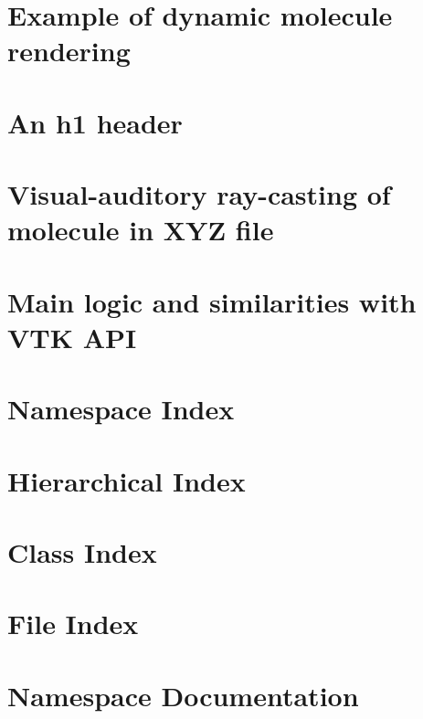 \let\mypdfximage\pdfximage\def\pdfximage{\immediate\mypdfximage}\documentclass[twoside]{book}
\newcommand{\+}{\discretionary{\mbox{\scriptsize$\hookleftarrow$}}{}{}}
\begin{document}
\chapter{Example of dynamic molecule rendering}
\label{md_core_src_doc_molecule_pipeline}

\chapter{An h1 header}
\label{md_core_src_doc_tutorial_s_d_f}

\chapter{Visual-\/auditory ray-\/casting of molecule in X\+YZ file}
\label{md_core_src_doc_va_molecule_raycast}

\chapter{Main logic and similarities with V\+TK A\+PI}
\label{md_core_src_doc_vtkstyle}

\chapter{Namespace Index}

\chapter{Hierarchical Index}

\chapter{Class Index}

\chapter{File Index}

\chapter{Namespace Documentation}



\end{document}
